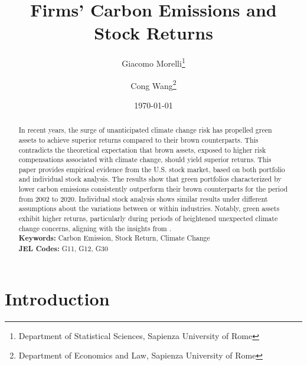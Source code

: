 \documentclass[12pt]{article}
\begin{document}
\begin{titlepage}
\title{Firms' Carbon Emissions and Stock Returns}
\author{Giacomo Morelli\thanks{Department of Statistical Sciences, Sapienza University of Rome} \and 
Cong Wang\thanks{Department of Economics and Law, Sapienza University of Rome}}
\date{\today}
\maketitle
\begin{abstract}
\noindent In recent years, the surge of unanticipated climate change risk has propelled green assets to achieve superior returns compared to their brown counterparts. This contradicts the theoretical expectation that brown assets, exposed to higher risk compensations associated with climate change, should yield superior returns. This paper provides empirical evidence from the U.S. stock market, based on both portfolio and individual stock analysis. The results show that green portfolios characterized by lower carbon emissions consistently outperform their brown counterparts for the period from 2002 to 2020. Individual stock analysis shows similar results under different assumptions about the variations between or within industries. Notably, green assets exhibit higher returns, particularly during periods of heightened unexpected climate change concerns, aligning with the insights from \cite{ardia2022climate}.\\

\noindent\textbf{Keywords:} Carbon Emission, Stock Return, Climate Change\\

\noindent\textbf{JEL Codes:} G11, G12, G30\\
\bigskip
\end{abstract}
\setcounter{page}{0}
\thispagestyle{empty}
\end{titlepage}
\pagebreak \newpage

\doublespacing

\section{Introduction} \label{sec:introduction}
\end{document}
